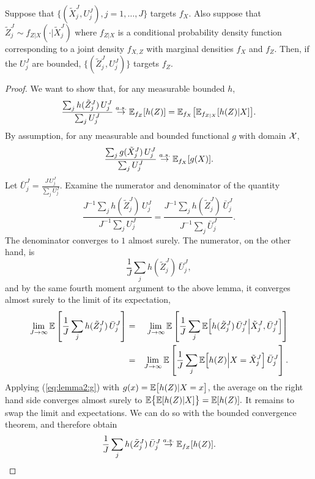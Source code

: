 \begin{lem}
    \label{lem:marginal-proper-weights}
    Suppose that $\{(\tilde X_j^J,U_j^J),j=1,\dots,J\}$ targets $f_X$. Also suppose that $\tilde Z_j^J \sim f_{Z|X}(\cdot | \tilde X_j^J)$ where $f_{Z|X}$ is a conditional probability density function corresponding to a joint density $f_{X,Z}$ with marginal densities $f_X$ and $f_Z$. Then, if the $U_j^J$ are bounded, $\{(\tilde Z_j^J,U_j^J)\}$ targets $f_Z$.
\end{lem}
\begin{proof}
    We want to show that, for any measurable bounded $h$, 
     \begin{equation}
     \frac{\sum_j h(\tilde Z_j^J) \, U_j^J}{\sum_j U_j^J} \stackrel{a.s.}{\to} \mathbb{E}_{f_Z}[h(Z)] = \mathbb{E}_{f_X}\big[\mathbb{E}_{f_{Z|X}}[h(Z) | X]\big].
     \end{equation}
    By assumption, for any measurable and bounded functional $g$ with domain ${\mathcal{X}}$,
    \begin{equation}\label{eq:lemma2:g}
    \frac{\sum_j g(\tilde X_j^J)\, U_j^J}{\sum_j U_j^J} \stackrel{a.s.}{\to} \mathbb{E}_{f_X}[g(X)].
    \end{equation}
    Let $\bar{U}_j^J = \frac{J \, U_j^J}{\sum_j U_j^J}$. Examine the numerator and denominator of the quantity \begin{equation}\frac{J^{-1}\sum_j h(\tilde Z_j^J) \, U_j^J}{J^{-1}\sum_j U_j^J} = \frac{J^{-1}\sum_j h(\tilde Z_j^J) \, \bar{U}_j^J}{J^{-1}\sum_j \bar{U}_j^J}.\end{equation}
    The denominator converges to $1$ almost surely. The numerator, on the other hand, is
    \begin{equation}
    \frac{1}{J}\sum_j h(\tilde Z_j^J)\, \bar{U}_j^J,
    \end{equation}
    and by the same fourth moment argument to the above lemma, it converges almost surely to the limit of its expectation,
    \begin{eqnarray}        
    \lim_{J\to\infty} \mathbb{E}\left[\frac{1}{J}\sum_j h(\tilde Z_j^J)\, \bar{U}_j^J\right] 
    &=& \lim_{J\to\infty} \mathbb{E} \left[\frac{1}{J}\sum_j  
      \mathbb{E}\Big[ h(\tilde Z_j^J)\, \bar{U}_j^J\Big|\tilde X_j^J, \bar U_j^J\Big]
    \right]
    \\
    &=& \lim_{J\to\infty} \mathbb{E} \left[\frac{1}{J}\sum_j  \mathbb{E}\Big[h(Z) \Big| X=\tilde X_j^J \Big] \, \bar U_j^J\right].
    \end{eqnarray}
    Applying (\ref{eq:lemma2:g}) with $g(x) = \mathbb{E}\big[h(Z) | X=x\big]$, the average on the right hand side converges almost surely to $\mathbb{E}\big\{\mathbb{E}[h(Z)|X]\big\}=\mathbb{E}[h(Z)].$
    It remains to swap the limit and expectations. We can do so with the bounded convergence theorem, and therefore obtain   
    \begin{equation}\frac{1}{J}\sum_j h(\tilde Z_j^J)\,\bar{U}_j^J \stackrel{a.s.}{\to} \mathbb{E}_{f_Z}[h(Z)].\end{equation} 
    \end{proof}

